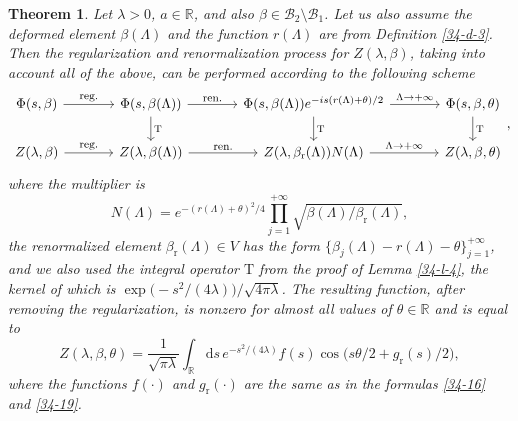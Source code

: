\documentclass[a4paper]{article}
\newtheorem{theorem}{Theorem}
\begin{document}
\begin{theorem}\label{34-t-2}
Let $\lambda>0$, $a\in\mathbb{R}$, and also $\beta\in\mathcal{B}_2\setminus\mathcal{B}_1$. Let us also assume the deformed element $\beta(\Lambda)$ and the function $r(\Lambda)$ are from Definition \ref{34-d-3}. Then the regularization and renormalization process for $Z(\lambda,\beta)$, taking into account all of the above, can be performed according to the following scheme
\begin{equation}\label{34-32}
	\begin{tikzcd}[column sep=3pc]
		\Phi(s,\beta) \arrow{r}{\footnotesize\mbox{reg.}} & 
		\Phi(s,\beta(\Lambda)) \arrow{r}{\footnotesize\mbox{ren.}} \arrow{d}{\mathrm{T}} &
		\Phi(s,\beta(\Lambda))e^{-is(r(\Lambda)+\theta)/2} \arrow{r}{\footnotesize\Lambda\to+\infty} \arrow{d}{\mathrm{T}} &
		\Phi(s,\beta,\theta)\arrow{d}{\mathrm{T}}\\
		Z(\lambda,\beta) \arrow{r}{\footnotesize\mbox{reg.}}  & 
		Z(\lambda,\beta(\Lambda)) \arrow{r}{\footnotesize\mbox{ren.}} &
		Z(\lambda,\beta_{\mathrm{r}}(\Lambda))N(\Lambda) \arrow{r}{\footnotesize\Lambda\to+\infty} &
		Z(\lambda,\beta,\theta)
	\end{tikzcd},
\end{equation}
where the multiplier is
\begin{equation}\label{34-31}
N(\Lambda) 
=e^{-(r(\Lambda)+\theta)^2/4}\prod_{j=1}^{+\infty}\sqrt{\beta(\Lambda)/\beta_{\mathrm{r}}(\Lambda)},
\end{equation}
the renormalized element $\beta_{\mathrm{r}}(\Lambda)\in V$ has the form $\{\beta_j(\Lambda)-r(\Lambda)-\theta\}_{j=1}^{+\infty}$, and we also used the integral operator $\mathrm{T}$ from the proof of Lemma \ref{34-l-4}, the kernel of which is $\exp\big(-s^2/(4\lambda)\big)/\sqrt{4\pi\lambda}$. The resulting function, after removing the regularization, is nonzero for almost all values of $\theta\in\mathbb{R}$ and is equal to
\begin{equation}\label{34-22}
Z(\lambda,\beta,\theta)=\frac{1}{\sqrt{\pi\lambda}}
\int_{\mathbb{R}}\mathrm{d}s\,e^{-s^2/(4\lambda)}f(s)\cos\big(s\theta/2+g_{\mathrm{r}}(s)/2\big),
\end{equation}
where the functions $f(\cdot)$ and $g_{\mathrm{r}}(\cdot)$ are the same as in the formulas \eqref{34-16} and \eqref{34-19}.
\end{theorem}
\end{document}
